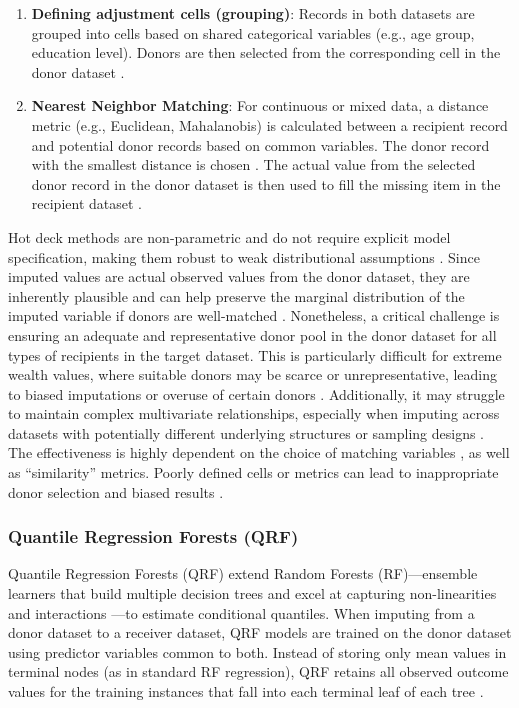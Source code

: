 \begin{enumerate}
    \item \textbf{Defining adjustment cells (grouping)}: Records in both datasets are grouped into cells based on shared categorical variables (e.g., age group, education level). Donors are then selected from the corresponding cell in the donor dataset \citep{chen2000nearest}.  

    \item \textbf{Nearest Neighbor Matching}: For continuous or mixed data, a distance metric (e.g., Euclidean, Mahalanobis) is calculated between a recipient record and potential donor records based on common variables. The donor record with the smallest distance is chosen \citep{dorazio2021statistical}. The actual value from the selected donor record in the donor dataset is then used to fill the missing item in the recipient dataset \citep{andridge2010review}.
\end{enumerate}

Hot deck methods are non-parametric and do not require explicit model specification, making them robust to weak distributional assumptions \citep{dorazio2021statistical}. Since imputed values are actual observed values from the donor dataset, they are inherently plausible and can help preserve the marginal distribution of the imputed variable if donors are well-matched \citep{andridge2010review}. Nonetheless, a critical challenge is ensuring an adequate and representative donor pool in the donor dataset for all types of recipients in the target dataset. This is particularly difficult for extreme wealth values, where suitable donors may be scarce or unrepresentative, leading to biased imputations or overuse of certain donors \citep{haziza2009imputation}. Additionally, it may struggle to maintain complex multivariate relationships, especially when imputing across datasets with potentially different underlying structures or sampling designs \citep{siddique2008multiple}. The effectiveness is highly dependent on the choice of matching variables \citep{ota2012revenue}, as well as “similarity” metrics. Poorly defined cells or metrics can lead to inappropriate donor selection and biased results \citep{andridge2010review}.

\subsubsection{Quantile Regression Forests (QRF)}

Quantile Regression Forests (QRF) \citep{meinshausen2006quantile} extend Random Forests (RF)—ensemble learners that build multiple decision trees and excel at capturing non-linearities and interactions \citep{breiman2001random}—to estimate conditional quantiles. When imputing from a donor dataset to a receiver dataset, QRF models are trained on the donor dataset using predictor variables common to both. Instead of storing only mean values in terminal nodes (as in standard RF regression), QRF retains all observed outcome values for the training instances that fall into each terminal leaf of each tree \citep{meinshausen2006quantile}. 


